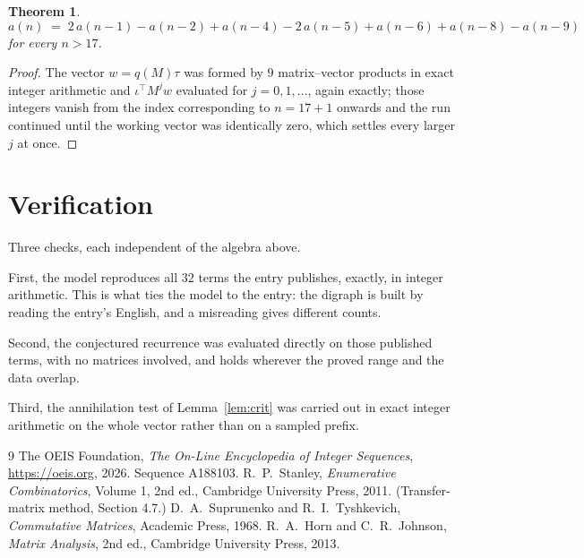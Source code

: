 \documentclass[11pt,a4paper]{article}
\theoremstyle{plain}
\newtheorem{theorem}{Theorem}
\theoremstyle{definition}
\begin{document}
\begin{theorem}
\[
a(n)\;=\;2\,a(n-1) - a(n-2) + a(n-4) - 2\,a(n-5) + a(n-6) + a(n-8) - a(n-9)
\]
for every $n>17$.
\end{theorem}

\begin{proof}
The vector $w=q(M)\tau$ was formed by $9$ matrix--vector products in exact integer
arithmetic and $\iota^{\!\top}M^{j}w$ evaluated for $j=0,1,\dots$, again exactly; those
integers vanish from the index corresponding to $n=17+1$ onwards and the run continued
until the working vector was identically zero, which settles every larger $j$ at once.
\end{proof}

\section{Verification}

Three checks, each independent of the algebra above.

First, the model reproduces all $32$ terms the entry publishes, exactly, in integer
arithmetic. This is what ties the model to the entry: the digraph is built by reading the
entry's English, and a misreading gives different counts.

Second, the conjectured recurrence was evaluated directly on those published terms, with no
matrices involved, and holds wherever the proved range and the data overlap.

Third, the annihilation test of Lemma~\ref{lem:crit} was carried out in exact integer
arithmetic on the whole vector rather than on a sampled prefix.

\begin{thebibliography}{9}
 The OEIS Foundation, \emph{The On-Line Encyclopedia of Integer
Sequences}, \url{https://oeis.org}, 2026. Sequence A188103.
 R.~P.~Stanley, \emph{Enumerative Combinatorics}, Volume 1, 2nd ed.,
Cambridge University Press, 2011. (Transfer-matrix method, Section 4.7.)
 D.~A.~Suprunenko and R.~I.~Tyshkevich, \emph{Commutative Matrices},
Academic Press, 1968.
 R.~A.~Horn and C.~R.~Johnson, \emph{Matrix Analysis}, 2nd ed., Cambridge
University Press, 2013.
\end{thebibliography}
\end{document}
